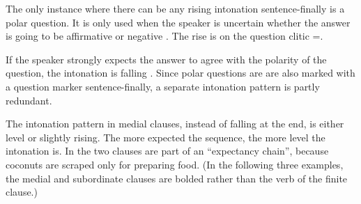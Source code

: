
\newpage	
The only instance where there can be any rising intonation sentence-finally is a polar question.  It is only used when the speaker is uncertain whether the answer is going to be affirmative or negative .  The rise is on the question clitic =.  




If the speaker strongly expects the answer to agree with the polarity of the question, the intonation is falling . Since polar questions are are also marked with a question marker \textstyleStyleVernacularWordsItalic{=} sentence-finally, a separate intonation pattern is partly redundant.




The intonation pattern in medial clauses, instead of falling at the end, is either level or slightly rising.  The more expected the sequence, the more level the intonation is. In  the two clauses are part of an ``expectancy chain'', because coconuts are scraped only for preparing food. (In the following three examples, the medial and subordinate clauses are bolded rather than the verb of the finite clause.)


